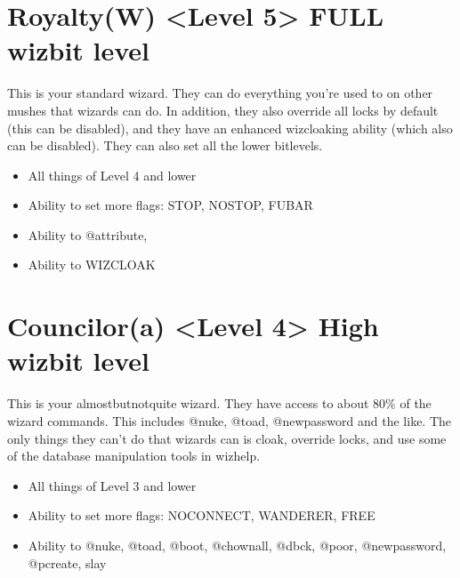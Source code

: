 \documentclass[letterpaper,10pt,english]{sphinxmanual}
\begin{document}
\section{Royalty(W) \textless{}Level 5\textgreater{} \sphinxhyphen{} FULL wizbit level}
\label{\detokenize{bitlevels:royalty-w-level-5-full-wizbit-level}}
\sphinxAtStartPar
This is your standard wizard.  They can do everything you’re
used to on other mushes that wizards can do.  In addition, they
also override all locks by default (this can be disabled), and
they have an enhanced wizcloaking ability (which also can be
disabled).  They can also set all the lower bitlevels.
\begin{itemize}
\item {} 
\sphinxAtStartPar
All things of Level 4 and lower

\item {} 
\sphinxAtStartPar
Ability to set more flags: STOP, NOSTOP, FUBAR

\item {} 
\sphinxAtStartPar
Ability to @attribute,

\item {} 
\sphinxAtStartPar
Ability to WIZCLOAK

\end{itemize}


\section{Councilor(a) \textless{}Level 4\textgreater{} \sphinxhyphen{} High wizbit level}
\label{\detokenize{bitlevels:councilor-a-level-4-high-wizbit-level}}
\sphinxAtStartPar
This is your almost\sphinxhyphen{}but\sphinxhyphen{}not\sphinxhyphen{}quite wizard.  They have access to
about 80\% of the wizard commands.  This includes @nuke, @toad,
@newpassword and the like.  The only things they can’t do that
wizards can is cloak, override locks, and use some of the
database manipulation tools in wizhelp.
\begin{itemize}
\item {} 
\sphinxAtStartPar
All things of Level 3 and lower

\item {} 
\sphinxAtStartPar
Ability to set more flags: NOCONNECT, WANDERER, FREE

\item {} 
\sphinxAtStartPar
Ability to @nuke, @toad, @boot, @chownall, @dbck, @poor, @newpassword, @pcreate, slay

\end{itemize}
\end{document}
